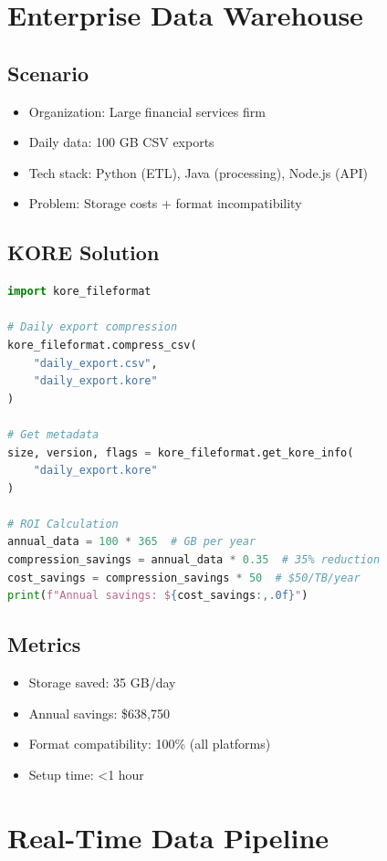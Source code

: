 \documentclass[12pt,a4paper]{report}
\begin{document}
\section{Enterprise Data Warehouse}

\subsection{Scenario}
\begin{itemize}
    \item Organization: Large financial services firm
    \item Daily data: 100 GB CSV exports
    \item Tech stack: Python (ETL), Java (processing), Node.js (API)
    \item Problem: Storage costs + format incompatibility
\end{itemize}

\subsection{KORE Solution}

\begin{lstlisting}[language=Python]
import kore_fileformat

# Daily export compression
kore_fileformat.compress_csv(
    "daily_export.csv", 
    "daily_export.kore"
)

# Get metadata
size, version, flags = kore_fileformat.get_kore_info(
    "daily_export.kore"
)

# ROI Calculation
annual_data = 100 * 365  # GB per year
compression_savings = annual_data * 0.35  # 35% reduction
cost_savings = compression_savings * 50  # $50/TB/year
print(f"Annual savings: ${cost_savings:,.0f}")
\end{lstlisting}

\subsection{Metrics}
\begin{itemize}
    \item Storage saved: 35 GB/day
    \item Annual savings: \$638,750
    \item Format compatibility: 100\% (all platforms)
    \item Setup time: <1 hour
\end{itemize}

\section{Real-Time Data Pipeline}
\end{document}
